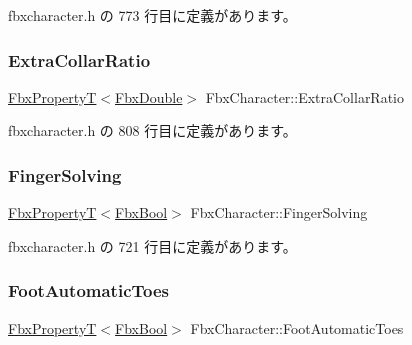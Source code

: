  fbxcharacter.\+h の 773 行目に定義があります。

\mbox{\label{class_fbx_character_a49b43a339e47ff3366081d5743f30d38}} 
\subsubsection{\texorpdfstring{Extra\+Collar\+Ratio}{ExtraCollarRatio}}
{\footnotesize\ttfamily \hyperlink{class_fbx_property_t}{Fbx\+PropertyT}$<$\hyperlink{fbxtypes_8h_a171e72a1c46fc15c1a6c9c31948c1c5b}{Fbx\+Double}$>$ Fbx\+Character\+::\+Extra\+Collar\+Ratio}



 fbxcharacter.\+h の 808 行目に定義があります。

\mbox{\label{class_fbx_character_a1d329d6b89abc23f5f966a28b1bd3194}} 
\subsubsection{\texorpdfstring{Finger\+Solving}{FingerSolving}}
{\footnotesize\ttfamily \hyperlink{class_fbx_property_t}{Fbx\+PropertyT}$<$\hyperlink{fbxtypes_8h_a92e0562b2fe33e76a242f498b362262e}{Fbx\+Bool}$>$ Fbx\+Character\+::\+Finger\+Solving}



 fbxcharacter.\+h の 721 行目に定義があります。

\mbox{\label{class_fbx_character_ae01ebb9daadf7c434629ebd51c1c1d9b}} 
\subsubsection{\texorpdfstring{Foot\+Automatic\+Toes}{FootAutomaticToes}}
{\footnotesize\ttfamily \hyperlink{class_fbx_property_t}{Fbx\+PropertyT}$<$\hyperlink{fbxtypes_8h_a92e0562b2fe33e76a242f498b362262e}{Fbx\+Bool}$>$ Fbx\+Character\+::\+Foot\+Automatic\+Toes}



